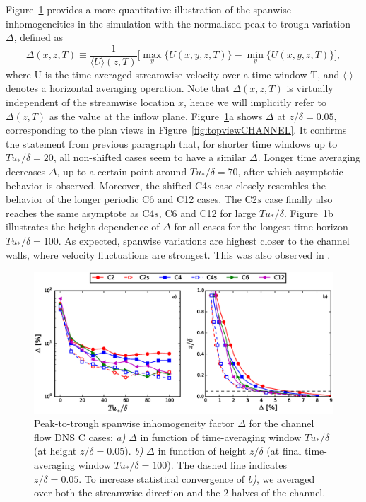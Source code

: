 		Figure~\ref{fig:delta_factorCHANNEL} provides a more quantitative illustration of the spanwise inhomogeneities in the simulation with the normalized peak-to-trough variation $\Delta$, defined as
		\begin{equation}
		\Delta(x,z,T) \equiv \frac{1}{\langle U \rangle (z,T)} \bigg [ \max_y \{ U(x,y,z,T) \} - \min_y \{ U(x,y,z,T)  \}  \bigg ],
		\end{equation}
		where U is the time-averaged streamwise velocity over a time window T, and $\langle \cdot \rangle$ denotes a horizontal averaging operation. Note that $\Delta(x,z,T)$ is virtually independent of the streamwise location $x$, hence we will implicitly refer to $\Delta(z,T)$ as the value at the inflow plane. Figure~\ref{fig:delta_factorCHANNEL}a shows $\Delta$ at $z/\delta = 0.05$, corresponding to the plan views in Figure~\ref{fig:topviewCHANNEL}. It confirms the statement from previous paragraph that, for shorter time windows up to $Tu_*/\delta = 20$, all non-shifted cases seem to have a similar $\Delta$. Longer time averaging decreases $\Delta$, up to a certain point around $Tu_*/\delta = 70$, after which asymptotic behavior is observed. Moreover, the shifted C4$s$ case closely resembles the behavior of the longer periodic C6 and C12 cases. The C2$s$ case finally also reaches the same asymptote as C4$s$, C6 and C12 for large $Tu_*/\delta$. Figure~\ref{fig:delta_factorCHANNEL}b illustrates the height-dependence of $\Delta$ for all cases for the longest time-horizon $Tu_*/\delta = 100$. As expected, spanwise variations are highest closer to the channel walls, where velocity fluctuations are strongest. This was also observed in \cite{fishpool2009persistent}.
		
		\begin{figure}
			\centering
			\includegraphics[width=\textwidth, trim= 0cm 0.15cm 0cm 0.cm,clip]{chapters/turbulent_inflow/spbc/figure5}
			\caption[Peak-to-trough spanwise inhomogeneity factor $\Delta$ for the channel flow DNS C cases.]{Peak-to-trough spanwise inhomogeneity factor $\Delta$ for the channel flow DNS C cases: \emph{a)} $\Delta$ in function of time-averaging window $Tu_*/\delta$ (at height $z/\delta = 0.05$). \emph{b)} $\Delta$ in function of height $z/\delta$ (at final time-averaging window $Tu_*/\delta = 100$). The dashed line indicates $z/\delta = 0.05$. To increase statistical convergence of \emph{b)}, we averaged over both the streamwise direction and the 2 halves of the channel. }
			\label{fig:delta_factorCHANNEL}
		\end{figure}
		
